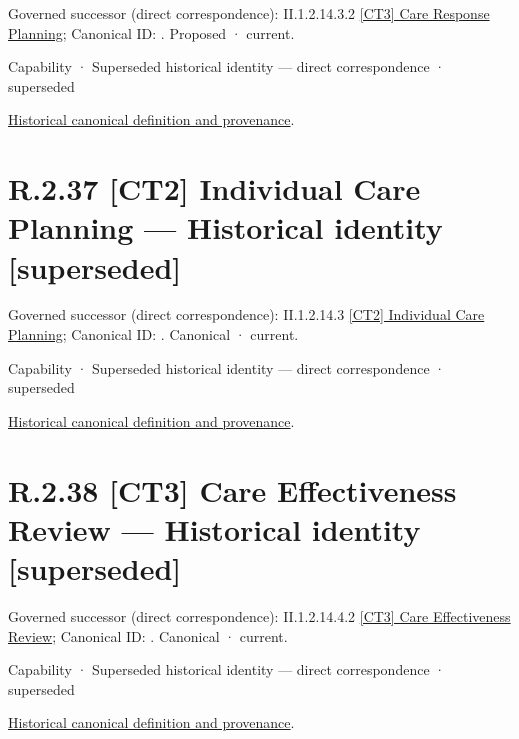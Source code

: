 {\small Governed successor (direct correspondence): II.1.2.14.3.2 \hyperref[element:2636e43903e44a97ad5b8db32692ce8b]{[CT3] Care Response Planning}; Canonical ID: \texttt{}. Proposed · current.}\par
\label{element:d64569acaf2c44f3b2a5332f74fff7c7}
{\small Capability · Superseded historical identity — direct correspondence · superseded}\par
\href{../../../../continuum/strategy/capability/d64569acaf2c44f3b2a5332f74fff7c7.md}{Historical canonical definition and provenance}.\par
\section*{R.2.37 [CT2] Individual Care Planning — Historical identity [superseded]}
\label{navigation:R.2.37}

{\small Governed successor (direct correspondence): II.1.2.14.3 \hyperref[element:f036a9866459429a8fb5f5e10727b5e8]{[CT2] Individual Care Planning}; Canonical ID: \texttt{}. Canonical · current.}\par
\label{element:574e61e230e643f78c58649adb4db313}
{\small Capability · Superseded historical identity — direct correspondence · superseded}\par
\href{../../../../continuum/strategy/capability/574e61e230e643f78c58649adb4db313.md}{Historical canonical definition and provenance}.\par
\section*{R.2.38 [CT3] Care Effectiveness Review — Historical identity [superseded]}
\label{navigation:R.2.38}

{\small Governed successor (direct correspondence): II.1.2.14.4.2 \hyperref[element:79cfeaefeb174a54ba43343d37f035c1]{[CT3] Care Effectiveness Review}; Canonical ID: \texttt{}. Canonical · current.}\par
\label{element:31f49cdea9f44f188459503580c2b86e}
{\small Capability · Superseded historical identity — direct correspondence · superseded}\par
\href{../../../../continuum/strategy/capability/31f49cdea9f44f188459503580c2b86e.md}{Historical canonical definition and provenance}.\par
